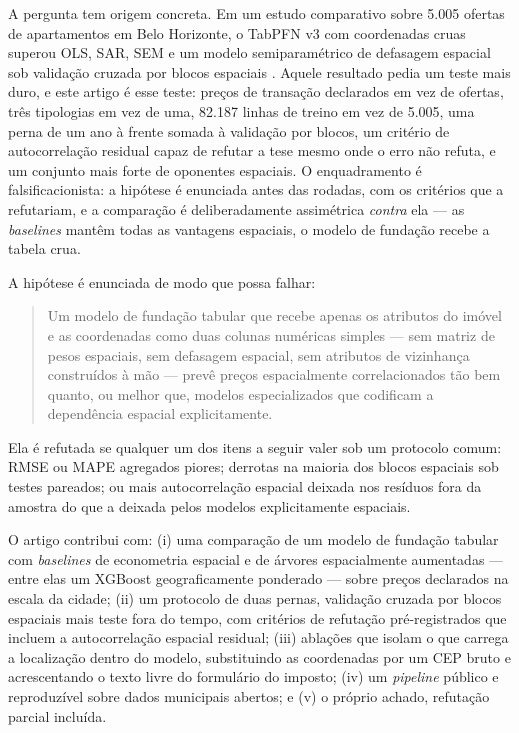 \documentclass[11pt,a4paper]{article}
\begin{document}
A pergunta tem origem concreta. Em um estudo comparativo sobre 5.005 ofertas de apartamentos em
Belo Horizonte, o TabPFN v3 com coordenadas cruas superou OLS, SAR, SEM e um modelo
semiparamétrico de defasagem espacial sob validação cruzada por blocos espaciais
\citep{benvenho2026cead}. Aquele resultado pedia um teste mais duro, e este artigo é esse
teste: preços de transação declarados em vez de ofertas, três tipologias em vez de uma, 82.187
linhas de treino em vez de 5.005, uma perna de um ano à frente somada à validação por blocos,
um critério de autocorrelação residual capaz de refutar a tese mesmo onde o erro não refuta, e
um conjunto mais forte de oponentes espaciais. O enquadramento é falsificacionista: a hipótese
é enunciada antes das rodadas, com os critérios que a refutariam, e a comparação é
deliberadamente assimétrica \emph{contra} ela --- as \emph{baselines} mantêm todas as vantagens
espaciais, o modelo de fundação recebe a tabela crua.

A hipótese é enunciada de modo que possa falhar:

\begin{quote}
Um modelo de fundação tabular que recebe apenas os atributos do imóvel e as coordenadas como
duas colunas numéricas simples --- sem matriz de pesos espaciais, sem defasagem espacial, sem
atributos de vizinhança construídos à mão --- prevê preços espacialmente correlacionados tão
bem quanto, ou melhor que, modelos especializados que codificam a dependência espacial
explicitamente.
\end{quote}

Ela é refutada se qualquer um dos itens a seguir valer sob um protocolo comum: RMSE ou MAPE
agregados piores; derrotas na maioria dos blocos espaciais sob testes pareados; ou mais
autocorrelação espacial deixada nos resíduos fora da amostra do que a deixada pelos modelos
explicitamente espaciais.

O artigo contribui com: (i) uma comparação de um modelo de fundação tabular com
\emph{baselines} de econometria espacial e de árvores espacialmente aumentadas --- entre elas
um XGBoost geograficamente ponderado --- sobre preços declarados na escala da cidade; (ii) um
protocolo de duas pernas, validação cruzada por blocos espaciais mais teste fora do tempo, com
critérios de refutação pré-registrados que incluem a autocorrelação espacial residual; (iii)
ablações que isolam o que carrega a localização dentro do modelo, substituindo as coordenadas
por um CEP bruto e acrescentando o texto livre do formulário do imposto; (iv) um
\emph{pipeline} público e reproduzível sobre dados municipais abertos; e (v) o próprio achado,
refutação parcial incluída.
\end{document}

